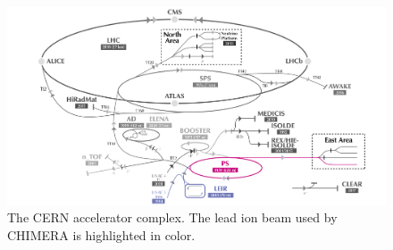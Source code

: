 \begin{figure}[!htb]
\centering
\includegraphics[width=1.0\textwidth]{images/CCC_eastt8_small.png}
\caption{The CERN accelerator complex. The lead ion beam used by CHIMERA is highlighted in color.}
\label{fig:CCC}
\end{figure}